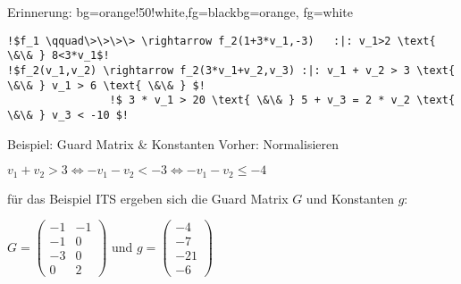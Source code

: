 \begin{frame}[fragile]
	\begin{variableblock}{Erinnerung: \its}{bg=orange!50!white,fg=black}{bg=orange, fg=white}
		\begin{lstlisting}[linewidth=10.5cm, escapechar = !]
!$f_1 \qquad\>\>\>\> \rightarrow f_2(1+3*v_1,-3)   :|: v_1>2 \text{ \&\& } 8<3*v_1$!
!$f_2(v_1,v_2) \rightarrow f_2(3*v_1+v_2,v_3) :|: v_1 + v_2 > 3 \text{ \&\& } v_1 > 6 \text{ \&\& } $!
				!$ 3 * v_1 > 20 \text{ \&\& } 5 + v_3 = 2 * v_2 \text{ \&\& } v_3 < -10 $!
		\end{lstlisting}
	\end{variableblock}
	\begin{exampleblock}{Beispiel: Guard Matrix \& Konstanten}
		Vorher: Normalisieren 
		\vspace*{-1em}
		\begin{center}
			$v_1+v_2 > 3 \Leftrightarrow -v_1-v_2 < -3 \Leftrightarrow -v_1-v_2 \le -4$
		\end{center}
		\vspace*{-1em}
		f\"ur das Beispiel ITS ergeben sich die Guard Matrix $G$ und Konstanten $g$:\newline
		\begin{center}
			\vspace{-2em}
			$G = \begin{pmatrix} -1 & -1 \\ -1 & 0 \\ -3 & 0 \\ 0 & 2 \end{pmatrix}$ und $g= \begin{pmatrix} -4 \\ -7 \\ -21 \\ -6 \end{pmatrix}$
		\end{center}		
	\end{exampleblock}
\end{frame}


